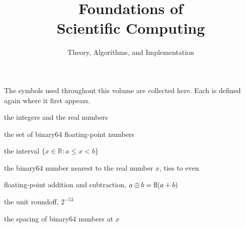 \documentclass{sdbook-eng}
\title{Foundations of\\Scientific Computing}
\subtitle{Theory, Algorithms, and Implementation}
\author{}
\date{}
\begin{document}
\frontmatter
\maketitle
\tableofcontents
\notationchapter
The symbols used throughout this volume are collected here. Each is defined again where it first appears.
\begin{symbols}
\item[$\mathbb Z$, $\mathbb R$] the integers and the real numbers
\item[$\mathbb F$] the set of binary64 floating-point numbers
\item[{$[a,b)$}] the interval $\{x\in\mathbb R: a\le x<b\}$
\end{symbols}
\begin{symbols}
\item[$\fl(x)$] the binary64 number nearest to the real number $x$, ties to even
\item[$\oplus$, $\ominus$] floating-point addition and subtraction, $a\oplus b=\mathop{\mathrm{fl}}\nolimits(a+b)$
\item[$u$] the unit roundoff, $2^{-53}$
\item[$\operatorname{ulp}(x)$] the spacing of binary64 numbers at $x$
\end{symbols}
\mainmatter

\backmatter
\end{document}
